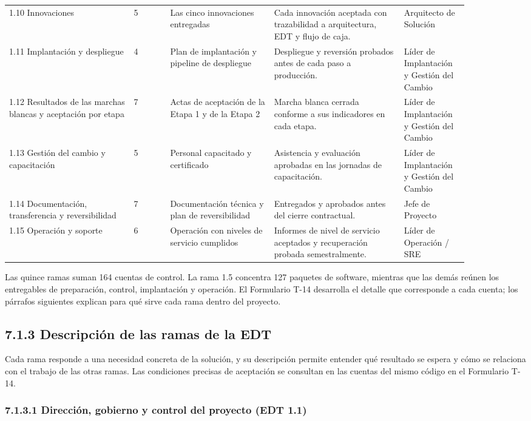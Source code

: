 \documentclass[11pt]{article}
\begin{document}
\begin{longtable}{p{0.24\linewidth}p{0.07\linewidth}p{0.2\linewidth}p{0.25\linewidth}p{0.12\linewidth}}
1.10 Innovaciones & 5 & Las cinco innovaciones entregadas & Cada innovación aceptada con trazabilidad a arquitectura, EDT y flujo de caja. & Arquitecto de Solución \\
1.11 Implantación y despliegue & 4 & Plan de implantación y pipeline de despliegue & Despliegue y reversión probados antes de cada paso a producción. & Líder de Implantación y Gestión del Cambio \\
1.12 Resultados de las marchas blancas y aceptación por etapa & 7 & Actas de aceptación de la Etapa 1 y de la Etapa 2 & Marcha blanca cerrada conforme a sus indicadores en cada etapa. & Líder de Implantación y Gestión del Cambio \\
1.13 Gestión del cambio y capacitación & 5 & Personal capacitado y certificado & Asistencia y evaluación aprobadas en las jornadas de capacitación. & Líder de Implantación y Gestión del Cambio \\
1.14 Documentación, transferencia y reversibilidad & 7 & Documentación técnica y plan de reversibilidad & Entregados y aprobados antes del cierre contractual. & Jefe de Proyecto \\
1.15 Operación y soporte & 6 & Operación con niveles de servicio cumplidos & Informes de nivel de servicio aceptados y recuperación probada semestralmente. & Líder de Operación / SRE \\
\end{longtable}


Las quince ramas suman 164 cuentas de control. La rama 1.5 concentra 127 paquetes de software, mientras que las demás reúnen los entregables de preparación, control, implantación y operación. El Formulario T-14 desarrolla el detalle que corresponde a cada cuenta; los párrafos siguientes explican para qué sirve cada rama dentro del proyecto.

\subsection{7.1.3 Descripción de las ramas de la EDT}

Cada rama responde a una necesidad concreta de la solución, y su descripción permite entender qué resultado se espera y cómo se relaciona con el trabajo de las otras ramas. Las condiciones precisas de aceptación se consultan en las cuentas del mismo código en el Formulario T-14.

\subsubsection{7.1.3.1 Dirección, gobierno y control del proyecto (EDT 1.1)}
\end{document}
